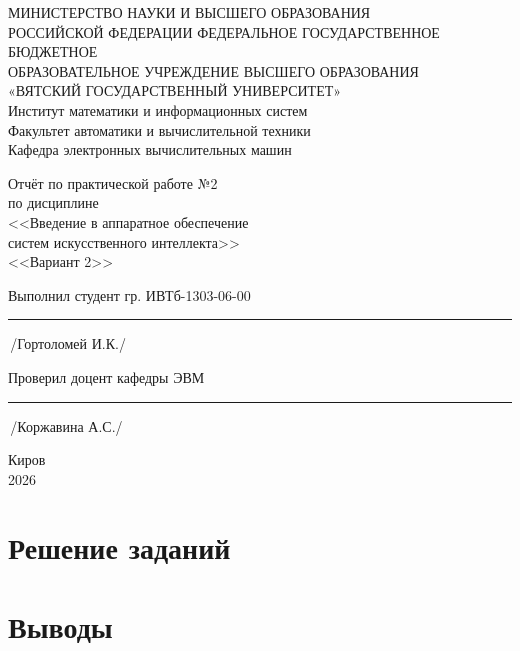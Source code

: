 \documentclass[oneside,a4paper,14pt]{extarticle} %
\begin{document}
	\newpage\thispagestyle{empty}
	\begin{center}
		МИНИСТЕРСТВО НАУКИ И ВЫСШЕГО ОБРАЗОВАНИЯ\\
			РОССИЙСКОЙ ФЕДЕРАЦИИ
			ФЕДЕРАЛЬНОЕ ГОСУДАРСТВЕННОЕ БЮДЖЕТНОЕ\\
			ОБРАЗОВАТЕЛЬНОЕ
			УЧРЕЖДЕНИЕ ВЫСШЕГО ОБРАЗОВАНИЯ\\
			«ВЯТСКИЙ ГОСУДАРСТВЕННЫЙ УНИВЕРСИТЕТ»\\
			Институт математики и информационных систем\\
			Факультет автоматики и вычислительной техники\\
			Кафедра электронных вычислительных машин
	\end{center}
	\vspace{20mm}

	\begin{center}
		Отчёт по практической работе №2\\
		по дисциплине\\
		<<Введение в аппаратное обеспечение \\ систем искусственного интеллекта>>\\
		<<Вариант 2>>\\
	\end{center}
	\vspace{48mm}

	Выполнил студент гр. ИВТб-1303-06-00 \hspace{10mm} \rule[-0,5mm]{23mm}{0.15mm}\,/Гортоломей И.К./


	Проверил доцент кафедры ЭВМ \hfill  \rule[-0,5mm]{30mm}{0.15mm}\,/Коржавина А.С./

	\vfill
	\begin{center}
		Киров\\
		2026
	\end{center}

	\newpage%


	\section*{Решение заданий}
	
	\newpage
	\section*{Выводы}
\end{document}
